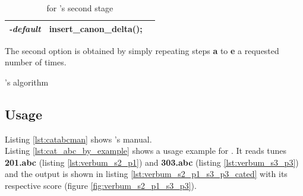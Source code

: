 \begin{enumerate}
\begin{center}
\begin{table}[h]
\begin{tabular}{|p{2.5cm}|p{4.75cm}|p{8cm}|}
        \hline
        \emph{-default} & insert\_canon\_delta(); &
        \\
        \hline
      \end{tabular}
      \caption{\abcdtrules{} for \catabc{}'s second stage}
      \label{tab:cat_snd_stg_rules}
    \end{table}
  \end{center}

  The second option is obtained by simply repeating steps \textbf{a} to \textbf{e} a requested
  number of times.
\end{enumerate}

\begin{algorithm}[h]
  \caption{\catabc{}'s algorithm}
  \label{alg:catabc}
\end{algorithm}

\subsection*{Usage}

Listing \ref{lst:catabcman} shows \catabc{}'s manual.\\



Listing \ref{lst:cat_abc_by_example} shows a usage example for \catabc{}. It reads tunes
\textbf{201.abc} (listing \ref{lst:verbum_s2_p1}) and \textbf{303.abc} (listing
\ref{lst:verbum_s3_p3}) and the output is shown in listing \ref{lst:verbum_s2_p1_s3_p3_cated} with
its respective score (figure \ref{fig:verbum_s2_p1_s3_p3}).\\

